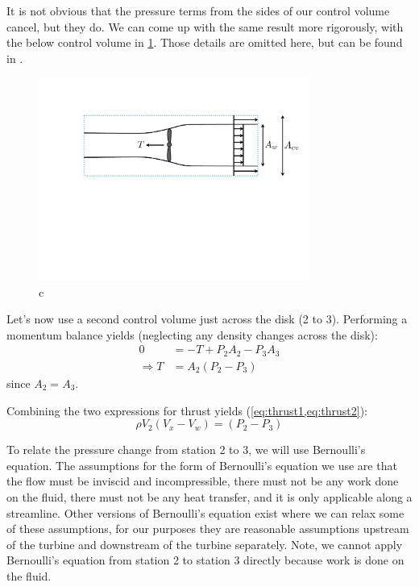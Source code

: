\documentclass{article}
\begin{document}
It is not obvious that the pressure terms from the sides of our control volume cancel, but they do.  We can come up with the same result more rigorously, with the below control volume in \cref{fig:turbine-cv}.  Those details are omitted here, but can be found in \cite{?}.

\begin{figure}[htbp]
\centering
\includegraphics[width=3.5in]{figures/turbine-cv}
\caption{c}
\label{fig:turbine-cv}
\end{figure}

Let's now use a second control volume just across the disk (2 to 3).  Performing a momentum balance yields (neglecting any density changes across the disk):
\begin{equation}
\begin{aligned}
    0 &= - T + P_2 A_2 - P_3 A_3\\
    \Rightarrow T &= A_2 (P_2 - P_3)
\end{aligned}
\label{eq:thrust2}
\end{equation}
since $A_2 = A_3$.

Combining the two expressions for thrust yields (\cref{eq:thrust1,eq:thrust2}):
\begin{equation}
    \rho V_2 (V_x - V_w) = (P_2 - P_3)
    \label{eq:momentum1}
\end{equation}

To relate the pressure change from station 2 to 3, we will use Bernoulli's equation.  The assumptions for the form of Bernoulli's equation we use are that the flow must be inviscid and incompressible, there must not be any work done on the fluid, there must not be any heat transfer, and it is only applicable along a streamline.  Other versions of Bernoulli's equation exist where we can relax some of these assumptions, for our purposes they are reasonable assumptions upstream of the turbine and downstream of the turbine separately.  Note, we cannot apply Bernoulli's equation from station 2 to station 3 directly because work is done on the fluid.
\end{document}
